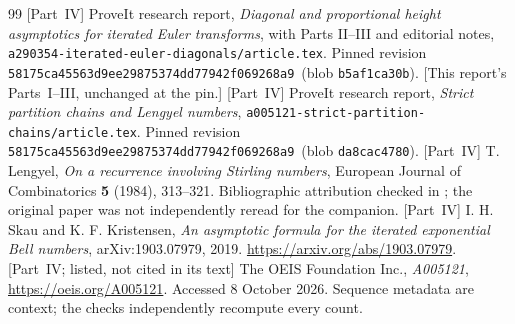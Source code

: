 \documentclass[11pt,letterpaper]{article}
\theoremstyle{remark}\newtheorem{remark}[theorem]{Remark}
\newcommand{\file}[1]{\nolinkurl{#1}}
\newcommand{\Repin}{\texttt{58175ca45563d9ee29875374dd77942f069268a9}}
\begin{document}
\begin{thebibliography}{99}
 [Part~IV] ProveIt research report, \emph{Diagonal and proportional height asymptotics for iterated Euler transforms}, with Parts II--III and editorial notes, \file{a290354-iterated-euler-diagonals/article.tex}. Pinned revision \Repin\ (blob \texttt{b5af1ca30b}). [This report's Parts~I--III, unchanged at the pin.]
 [Part~IV] ProveIt research report, \emph{Strict partition chains and Lengyel numbers}, \file{a005121-strict-partition-chains/article.tex}. Pinned revision \Repin\ (blob \texttt{da8cac4780}).
 [Part~IV] T. Lengyel, \emph{On a recurrence involving Stirling numbers}, European Journal of Combinatorics \textbf{5} (1984), 313--321. Bibliographic attribution checked in \cite{Prellberg}; the original paper was not independently reread for the companion.
 [Part~IV] I. H. Skau and K. F. Kristensen, \emph{An asymptotic formula for the iterated exponential Bell numbers}, arXiv:1903.07979, 2019. \url{https://arxiv.org/abs/1903.07979}.
 [Part~IV; listed, not cited in its text] The OEIS Foundation Inc., \emph{A005121}, \url{https://oeis.org/A005121}. Accessed 8 October 2026. Sequence metadata are context; the checks independently recompute every count.
\end{thebibliography}
\end{document}
